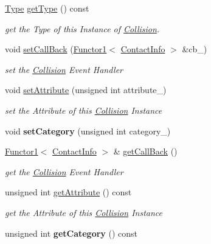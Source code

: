 \begin{DoxyCompactItemize}
\hyperlink{class_i_dream_sky_1_1_collision_a6f78283a27aaf9e6cf2c8a174f0ce816}{Type} \hyperlink{class_i_dream_sky_1_1_collision_a7874ca06ee40066bb822e31194a932dd}{get\+Type} () const 
\begin{DoxyCompactList}\small\item\em get the Type of this Instance of \hyperlink{class_i_dream_sky_1_1_collision}{Collision}. \end{DoxyCompactList}\item 
void \hyperlink{class_i_dream_sky_1_1_collision_a4ec805eb2d9b1314b3c470f4f014f556}{set\+Call\+Back} (\hyperlink{class_i_dream_sky_1_1_functor1}{Functor1}$<$ \hyperlink{class_i_dream_sky_1_1_collision_1_1_contact_info}{Contact\+Info} $>$ \&cb\+\_\+)
\begin{DoxyCompactList}\small\item\em set the \hyperlink{class_i_dream_sky_1_1_collision}{Collision} Event Handler \end{DoxyCompactList}\item 
void \hyperlink{class_i_dream_sky_1_1_collision_abaf472ab7f1f151f966cfbc1d55fe9aa}{set\+Attribute} (unsigned int attribute\+\_\+)
\begin{DoxyCompactList}\small\item\em set the Attribute of this \hyperlink{class_i_dream_sky_1_1_collision}{Collision} Instance \end{DoxyCompactList}\item 
void {\bfseries set\+Category} (unsigned int category\+\_\+)\hypertarget{class_i_dream_sky_1_1_collision_af07546b0296e34c1fc24adc166692c23}{}\label{class_i_dream_sky_1_1_collision_af07546b0296e34c1fc24adc166692c23}

\item 
\hyperlink{class_i_dream_sky_1_1_functor1}{Functor1}$<$ \hyperlink{class_i_dream_sky_1_1_collision_1_1_contact_info}{Contact\+Info} $>$ \& \hyperlink{class_i_dream_sky_1_1_collision_a41da4846e87ddc84006ce4155f1bd4f6}{get\+Call\+Back} ()
\begin{DoxyCompactList}\small\item\em get the \hyperlink{class_i_dream_sky_1_1_collision}{Collision} Event Handler \end{DoxyCompactList}\item 
unsigned int \hyperlink{class_i_dream_sky_1_1_collision_a87ca313908483a7ea68d0f5e22242567}{get\+Attribute} () const 
\begin{DoxyCompactList}\small\item\em get the Attribute of this \hyperlink{class_i_dream_sky_1_1_collision}{Collision} Instance \end{DoxyCompactList}\item 
unsigned int {\bfseries get\+Category} () const \hypertarget{class_i_dream_sky_1_1_collision_a4b65edb40ad1803c6d39986617575a4d}{}\label{class_i_dream_sky_1_1_collision_a4b65edb40ad1803c6d39986617575a4d}


\end{DoxyCompactItemize}
